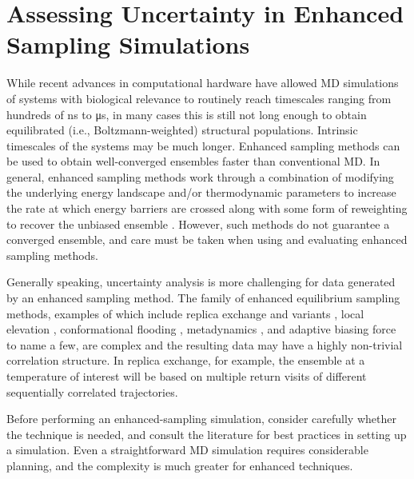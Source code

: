 %
%
%

\section{Assessing Uncertainty in Enhanced Sampling Simulations}
\label{sec:enhanced}

While recent advances in computational hardware have allowed MD simulations of systems with biological relevance to routinely reach timescales ranging from hundreds of \si{\nano\second} to \si{\micro\second}, in many cases this is still not long enough to obtain equilibrated (i.e., Boltzmann-weighted) structural populations.  Intrinsic timescales of the systems may be much longer.
Enhanced sampling methods can be used to obtain well-converged ensembles faster than conventional MD. In general, enhanced sampling methods work through a combination of modifying the underlying energy landscape and/or thermodynamic parameters to increase the rate at which energy barriers are crossed along with some form of reweighting to recover the unbiased ensemble \cite{Zuckerman2011}. However, such methods do not guarantee a converged ensemble, and care must be taken when using and evaluating enhanced sampling methods.

Generally speaking, uncertainty analysis is more challenging for data generated by an enhanced sampling method.
The family of enhanced equilibrium sampling methods, examples of which include replica exchange and variants \cite{Swendsen-1986,Sugita1999,Okamoto-2000}, local elevation \cite{Huber1994}, conformational flooding \cite{Grubmueller1995}, metadynamics \cite{Bussi2006a,Laio2008}, and adaptive biasing force \cite{Darve2001,Darve2008,Comer2015} to name a few, are complex and the resulting data may have a highly non-trivial correlation structure.
In replica exchange, for example, the ensemble at a temperature of interest will be based on multiple return visits of different sequentially correlated trajectories.

Before performing an enhanced-sampling simulation, consider carefully whether the technique is needed, and consult the literature for best practices in setting up a simulation.
Even a straightforward MD simulation requires considerable planning, and the complexity is much greater for enhanced techniques.

